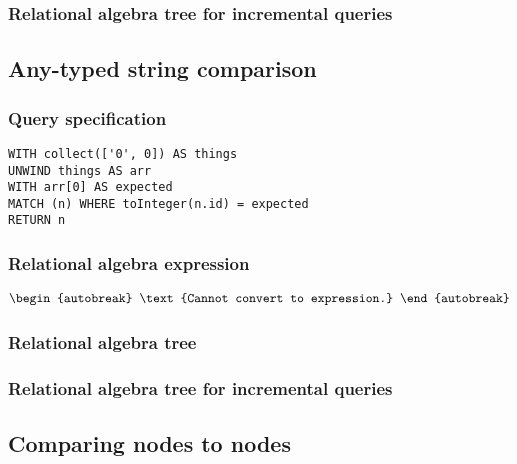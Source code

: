 \subsubsection*{Relational algebra tree for incremental queries}


\subsection{Any-typed string comparison}

\subsubsection*{Query specification}

\begin{lstlisting}
WITH collect(['0', 0]) AS things
UNWIND things AS arr
WITH arr[0] AS expected
MATCH (n) WHERE toInteger(n.id) = expected
RETURN n
\end{lstlisting}

\subsubsection*{Relational algebra expression}

\begin{align*}
\begin{autobreak}
\text{Cannot convert to expression.}
\end{autobreak}
\end{align*}

\subsubsection*{Relational algebra tree}


\subsubsection*{Relational algebra tree for incremental queries}


\subsection{Comparing nodes to nodes}

